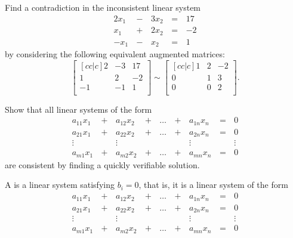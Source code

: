 \begin{applicationActivities}{3}{6}
\begin{activity}{10} %
  Find a contradiction in the inconsistent linear system
    \begin{alignat*}{4}
      2x_1 &\,-\,& 3x_2 &\,=\,& 17 \\
       x_1 &\,+\,& 2x_2 &\,=\,& -2 \\
      -x_1 &\,-\,&  x_2 &\,=\,& 1
    \end{alignat*}
  by considering the following equivalent augmented matrices:
  \[
    \begin{bmatrix}[cc|c]
       2 & -3 & 17 \\
       1 &  2 & -2 \\
      -1 & -1 &  1 \\
    \end{bmatrix}\sim
    \begin{bmatrix}[cc|c]
       1 &  2 & -2 \\
       0 &  1 &  3 \\
       0 &  0 &  2 \\
    \end{bmatrix}
  .\]
\end{activity}

\begin{activity}{5}
  Show that all linear systems of the form
  \begin{alignat*}{5}
    a_{11}x_1 &\,+\,& a_{12}x_2 &\,+\,& \dots  &\,+\,& a_{1n}x_n &\,=\,& 0 \\
    a_{21}x_1 &\,+\,& a_{22}x_2 &\,+\,& \dots  &\,+\,& a_{2n}x_n &\,=\,& 0 \\
     \vdots&  &\vdots&   &&  &\vdots&&\vdots  \\
    a_{m1}x_1 &\,+\,& a_{m2}x_2 &\,+\,& \dots  &\,+\,& a_{mn}x_n &\,=\,& 0
  \end{alignat*}
  are consistent by finding a
  quickly verifiable solution.
\end{activity}

\begin{definition}
  A  is a linear system satisfying \(b_i=0\), that is,
  it is a linear system of the form
  \begin{alignat*}{5}
    a_{11}x_1 &\,+\,& a_{12}x_2 &\,+\,& \dots  &\,+\,& a_{1n}x_n &\,=\,& 0 \\
    a_{21}x_1 &\,+\,& a_{22}x_2 &\,+\,& \dots  &\,+\,& a_{2n}x_n &\,=\,& 0 \\
     \vdots&  &\vdots&   &&  &\vdots&&\vdots  \\
    a_{m1}x_1 &\,+\,& a_{m2}x_2 &\,+\,& \dots  &\,+\,& a_{mn}x_n &\,=\,& 0
  \end{alignat*}
\end{definition}


\end{applicationActivities}
